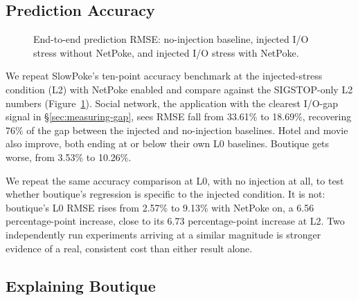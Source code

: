 \subsection{Prediction Accuracy}
\label{sec:accuracy}

\begin{figure}[t]
\centering
{}
\caption{End-to-end prediction RMSE: no-injection baseline, injected I/O
  stress without NetPoke, and injected I/O stress with NetPoke.}
\label{fig:rmse}
\end{figure}

We repeat SlowPoke's ten-point accuracy benchmark at the injected-stress
condition (L2) with NetPoke enabled and compare against the SIGSTOP-only
L2 numbers (Figure~\ref{fig:rmse}). Social network, the application with
the clearest I/O-gap signal in \S\ref{sec:measuring-gap}, sees RMSE fall
from 33.61\% to 18.69\%, recovering 76\% of the gap between the injected
and no-injection baselines. Hotel and movie also improve, both ending at
or below their own L0 baselines. Boutique gets worse, from 3.53\% to
10.26\%.

We repeat the same accuracy comparison at L0, with no injection at all,
to test whether boutique's regression is specific to the injected
condition. It is not: boutique's L0 RMSE rises from 2.57\% to 9.13\% with
NetPoke on, a 6.56 percentage-point increase, close to its 6.73
percentage-point increase at L2. Two independently run experiments
arriving at a similar magnitude is stronger evidence of a real, consistent
cost than either result alone.

\subsection{Explaining Boutique}

